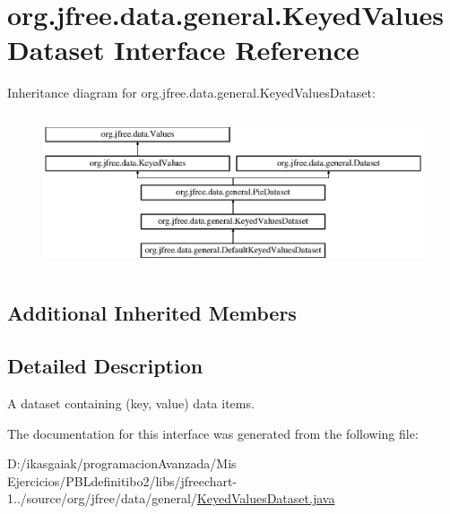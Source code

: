 \hypertarget{interfaceorg_1_1jfree_1_1data_1_1general_1_1_keyed_values_dataset}{}\section{org.\+jfree.\+data.\+general.\+Keyed\+Values\+Dataset Interface Reference}
\label{interfaceorg_1_1jfree_1_1data_1_1general_1_1_keyed_values_dataset}
Inheritance diagram for org.\+jfree.\+data.\+general.\+Keyed\+Values\+Dataset\+:\begin{figure}[H]
\begin{center}
\leavevmode
\includegraphics[height=4.590164cm]{interfaceorg_1_1jfree_1_1data_1_1general_1_1_keyed_values_dataset}
\end{center}
\end{figure}
\subsection*{Additional Inherited Members}


\subsection{Detailed Description}
A dataset containing (key, value) data items. 

The documentation for this interface was generated from the following file\+:\begin{DoxyCompactItemize}
\item 
D\+:/ikasgaiak/programacion\+Avanzada/\+Mis Ejercicios/\+P\+B\+Ldefinitibo2/libs/jfreechart-\/1../source/org/jfree/data/general/\mbox{\hyperlink{_keyed_values_dataset_8java}{Keyed\+Values\+Dataset.\+java}}\end{DoxyCompactItemize}
